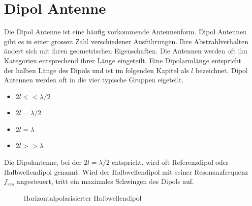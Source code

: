 \section{Dipol Antenne}
Die Dipol Antenne ist eine häufig vorkommende Antennenform.  Dipol Antennen gibt es in einer grossen Zahl verschiedener Ausführungen. Ihre Abstrahlverhalten ändert sich mit ihren geometrischen Eigenschaften. Die Antennen werden oft ihn Kategorien entsprechend ihrer Länge eingeteilt. Eine Dipolarmlänge entspricht der halben Länge des Dipols und ist im folgenden Kapitel als $l$ bezeichnet. Dipol Antennen werden oft in die  vier typische Gruppen eigeteilt. 
\begin{itemize}
\item $2l<< \lambda/2 $
\item $2l = \lambda/2 $
\item $2l = \lambda $
\item $2l>> \lambda $
\end{itemize} 
Die Dipolantenne, bei der $2l=\lambda/2$ entspricht, wird oft Referenzdipol oder Halbwellendipol genannt. Wird der Halbwellendipol mit seiner Resonanzfrequenz $f_{res}$ angesteuert, tritt ein maximales Schwingen des Dipols auf. 

\begin{figure}[!ht]%
	\begin{center}
	\end{center}
\caption{Horizontalpolarisierter Halbwellendipol}
\label{fig:HalbWellenDipolHorizontal}
\end{figure}

